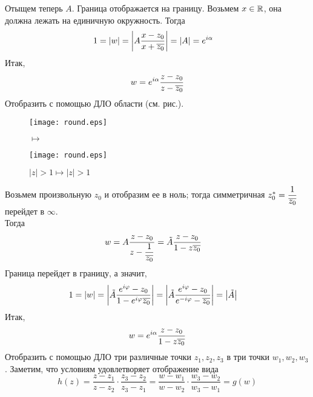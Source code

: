 Отыщем теперь $A$. Граница отображается на границу. Возьмем $x \in \mathbb{R}$, она
должна лежать на единичную окружность. Тогда
\begin{align*}
    & 1 = \left|{w}\right| = \left|{A\frac{x-z_0}{x+\overline{z_0}}}\right| = \left| A \right| = e^{i\alpha}
\end{align*}
Итак,
\begin{equation}\label{(23.6)}
    w = e^{i \alpha}\frac{z-z_0}{z-\overline{z_0}}
\end{equation}
\Example
Отобразить с помощью ДЛО области (см. рис.).
\\
\begin{figure}[h!]
    \begin{minipage}[c]{0.45\textwidth}
        \centering
        \texttt{[image: round.eps]}
    \end{minipage}
    \begin{minipage}[c]{0.1\textwidth}
        \centering
        \LARGE{$\mapsto$}
    \end{minipage}
    \begin{minipage}[c]{0.45\textwidth}
        \centering
        \texttt{[image: round.eps]}
    \end{minipage}
    \label{fig:23.3}
    \caption{$\left| z \right| > 1 \mapsto \left| z \right| > 1$}
\end{figure}
\nonum
Возьмем произвольную $z_0$ и отобразим ее в ноль; тогда симметричная $z_0^* =
\displaystyle \frac{1}{\overline{z_0}}$ перейдет в $\infty$.
\\
Тогда
\begin{align*}
    & w = A\frac{z-z_0}{z-\displaystyle \frac{1}{\overline{z_0}}} = \tilde{A}\frac{z-z_0}{1 - z\overline{z_0}}
\end{align*}
Граница перейдет в границу, а значит,
\begin{align*}
    & 1 = \left|{w}\right| = \left|{\tilde{A}\frac{e^{i \varphi}-z_0}{1 - e^{i \varphi}\overline{z_0}}}\right| = \left|{\tilde{A}\frac{e^{i \varphi}-z_0}{e^{-i \varphi}-\overline{z_0}}}\right| = \left|{\tilde{A}}\right|
\end{align*}
Итак,
\begin{equation}\label{(23.7)}
    w = e^{i \alpha}\frac{z-z_0}{1 - z\overline{z_0}}
\end{equation}
\Example
Отобразить с помощью ДЛО три различные точки $z_1, z_2, z_3$ в три точки $w_1,
w_2,w_3$.
\nonum
Заметим, что условиям удовлетворяет отображение вида
\begin{equation}\label{(23.8)}
    h(z) = \frac{z-z_1}{z-z_2} \cdot \frac{z_3-z_2}{z_3-z_1} = \frac{w-w_1}{w-w_2} \cdot \frac{w_3-w_2}{w_3-w_1} = g(w)
\end{equation}

